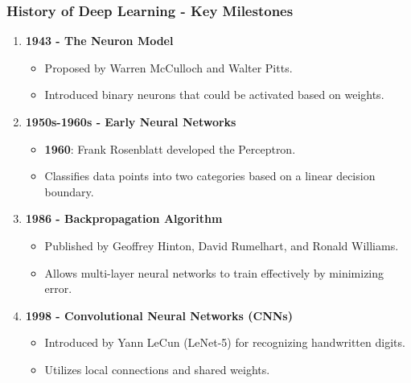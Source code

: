 \documentclass[aspectratio=169]{beamer}
\begin{document}
\begin{frame}[fragile]
    \frametitle{History of Deep Learning - Key Milestones}
    \begin{enumerate}
        \item \textbf{1943 - The Neuron Model}
        \begin{itemize}
            \item Proposed by Warren McCulloch and Walter Pitts.
            \item Introduced binary neurons that could be activated based on weights.
        \end{itemize}
        
        \item \textbf{1950s-1960s - Early Neural Networks}
        \begin{itemize}
            \item \textbf{1960}: Frank Rosenblatt developed the Perceptron.
            \item Classifies data points into two categories based on a linear decision boundary.
        \end{itemize}
        
        \item \textbf{1986 - Backpropagation Algorithm}
        \begin{itemize}
            \item Published by Geoffrey Hinton, David Rumelhart, and Ronald Williams.
            \item Allows multi-layer neural networks to train effectively by minimizing error.
        \end{itemize}
        
        \item \textbf{1998 - Convolutional Neural Networks (CNNs)}
        \begin{itemize}
            \item Introduced by Yann LeCun (LeNet-5) for recognizing handwritten digits.
            \item Utilizes local connections and shared weights.
        \end{itemize}
    \end{enumerate}
\end{frame}
\end{document}

